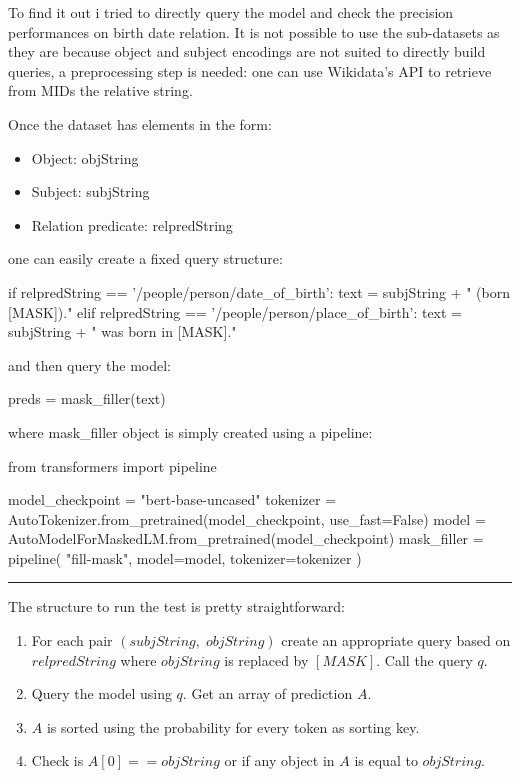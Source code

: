\documentclass{article}
\begin{document}
To find it out i tried to directly query the model and check the precision performances on birth date relation. It is not possible to use the sub-datasets as they are because object and subject encodings are not suited to directly build queries, a preprocessing step is needed: one can use Wikidata's API to retrieve from MIDs the relative string. 

Once the dataset has elements in the form:
\begin{itemize}
    \item Object: objString
    \item Subject: subjString
    \item Relation predicate: relpredString
\end{itemize}
one can easily create a fixed query structure:
\begin{python}
if relpredString == '/people/person/date_of_birth':
    text = subjString + " (born [MASK])."
elif relpredString == '/people/person/place_of_birth':
    text = subjString + " was born in [MASK]."
\end{python}
and then query the model:
\begin{python}
preds = mask_filler(text)
\end{python}
where mask\_filler object is simply created using a pipeline:
\begin{python}
from transformers import pipeline

model_checkpoint = "bert-base-uncased"
tokenizer = AutoTokenizer.from_pretrained(model_checkpoint, use_fast=False)
model = AutoModelForMaskedLM.from_pretrained(model_checkpoint)
mask_filler = pipeline(
    "fill-mask", model=model, tokenizer=tokenizer
)
\end{python}
\vspace{6pt}
\hrule
\vspace{6pt}
The structure to run the test is pretty straightforward:
\begin{enumerate}
    \item For each pair $(subjString,\;objString)$ create an appropriate query based on $relpredString$ where $objString$ is replaced by $[MASK]$. Call the query $q$.
    \item Query the model using $q$. Get an array of prediction $A$.
    \item $A$ is sorted using the probability for every token as sorting key.
    \item Check is $A[0] == objString$ or if any object in $A$ is equal to $objString$. 
\end{enumerate}
\end{document}
